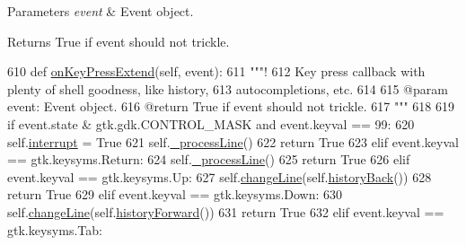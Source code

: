 \begin{DoxyParams}{Parameters}
{\em event} & Event object. \\
\hline
\end{DoxyParams}
\begin{DoxyReturn}{Returns}
True if event should not trickle. 
\end{DoxyReturn}

\begin{DoxyCode}
610   \textcolor{keyword}{def }\hyperlink{classvisualizer_1_1ipython__view_1_1IPythonView_a0f261fe53c5813480f2fb71b9236f380}{onKeyPressExtend}(self, event):
611     \textcolor{stringliteral}{"""!}
612 \textcolor{stringliteral}{    Key press callback with plenty of shell goodness, like history, }
613 \textcolor{stringliteral}{    autocompletions, etc.}
614 \textcolor{stringliteral}{    }
615 \textcolor{stringliteral}{    @param event: Event object.}
616 \textcolor{stringliteral}{    @return True if event should not trickle.}
617 \textcolor{stringliteral}{    """}
618 
619     \textcolor{keywordflow}{if} event.state & gtk.gdk.CONTROL\_MASK \textcolor{keywordflow}{and} event.keyval == 99:
620       self.\hyperlink{classvisualizer_1_1ipython__view_1_1IPythonView_ad3937b08cb14ec5390c2e0101952765e}{interrupt} = \textcolor{keyword}{True}
621       self.\hyperlink{classvisualizer_1_1ipython__view_1_1IPythonView_aaddffde5e573aaec140612a32208a206}{\_processLine}()
622       \textcolor{keywordflow}{return} \textcolor{keyword}{True}
623     \textcolor{keywordflow}{elif} event.keyval == gtk.keysyms.Return:
624       self.\hyperlink{classvisualizer_1_1ipython__view_1_1IPythonView_aaddffde5e573aaec140612a32208a206}{\_processLine}()
625       \textcolor{keywordflow}{return} \textcolor{keyword}{True}
626     \textcolor{keywordflow}{elif} event.keyval == gtk.keysyms.Up:
627       self.\hyperlink{classvisualizer_1_1ipython__view_1_1ConsoleView_a2294e6c3bf8231b2c18d35c1d92ea329}{changeLine}(self.\hyperlink{classvisualizer_1_1ipython__view_1_1IterableIPShell_a708ac9d5b786b5030e34c33f89c40b39}{historyBack}())
628       \textcolor{keywordflow}{return} \textcolor{keyword}{True}
629     \textcolor{keywordflow}{elif} event.keyval == gtk.keysyms.Down:
630       self.\hyperlink{classvisualizer_1_1ipython__view_1_1ConsoleView_a2294e6c3bf8231b2c18d35c1d92ea329}{changeLine}(self.\hyperlink{classvisualizer_1_1ipython__view_1_1IterableIPShell_ab9b3ab4f2615c08045eff31e2b18d88d}{historyForward}())
631       \textcolor{keywordflow}{return} \textcolor{keyword}{True}
632     \textcolor{keywordflow}{elif} event.keyval == gtk.keysyms.Tab:

\end{DoxyCode}
